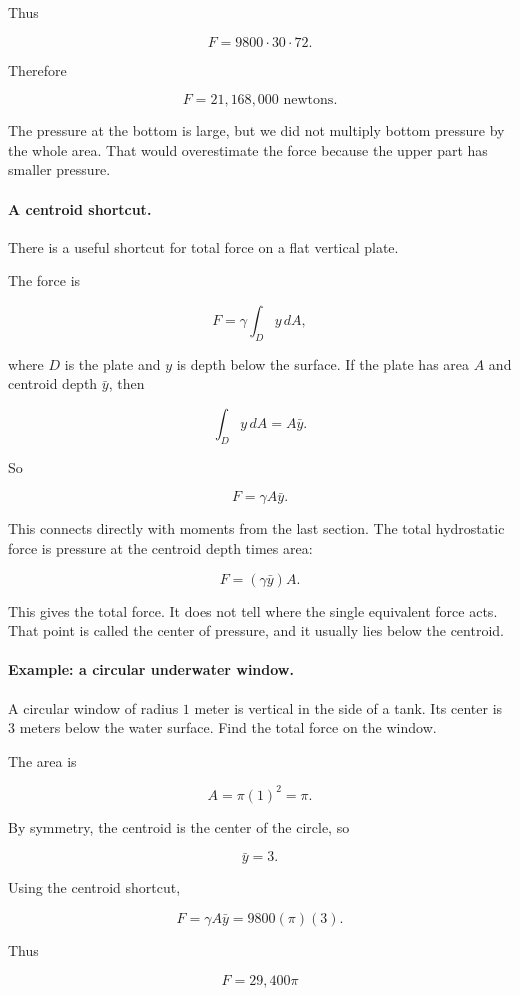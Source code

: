 Thus

\[
F=9800\cdot30\cdot72.
\]

Therefore

\[
\boxed{
F=21{,}168{,}000\text{ newtons}.
}
\]

The pressure at the bottom is large, but we did not multiply bottom pressure by the
whole area.  That would overestimate the force because the upper part has smaller
pressure.

\paragraph{A centroid shortcut.}
There is a useful shortcut for total force on a flat vertical plate.

The force is

\[
F=\gamma\int_D y\,dA,
\]

where \(D\) is the plate and \(y\) is depth below the surface.  If the plate has area \(A\)
and centroid depth \(\bar y\), then

\[
\int_D y\,dA=A\bar y.
\]

So

\[
\boxed{
F=\gamma A\bar y.
}
\]

This connects directly with moments from the last section.  The total hydrostatic force
is pressure at the centroid depth times area:

\[
F=(\gamma\bar y)A.
\]

This gives the total force.  It does not tell where the single equivalent force acts.  That
point is called the center of pressure, and it usually lies below the centroid.

\paragraph{Example: a circular underwater window.}
A circular window of radius \(1\) meter is vertical in the side of a tank.  Its center is
\(3\) meters below the water surface.  Find the total force on the window.

The area is

\[
A=\pi(1)^2=\pi.
\]

By symmetry, the centroid is the center of the circle, so

\[
\bar y=3.
\]

Using the centroid shortcut,

\[
F=\gamma A\bar y
=
9800(\pi)(3).
\]

Thus

\[
\boxed{
F=29{,}400\pi
}
\]

